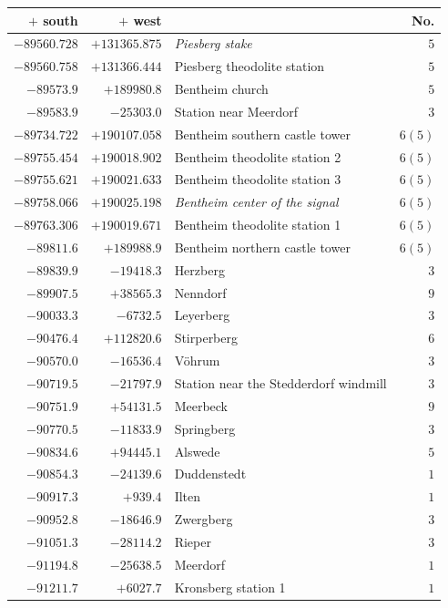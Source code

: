 \clearpage{}%
\begin{center}\begingroup\fontsize{8}{9}\selectfont
\setlength{\tabcolsep}{4pt}
\begin{tabular}{r|r|p{170pt}|r}\hline
\(+\) south&\(+\) west&&No.\\\hline
\(-89560.728\)&\(+131365.875\)&\textit{Piesberg stake}&\(5\)\\
\(-89560.758\)&\(+131366.444\)&Piesberg theodolite station&\(5\)\\
\(-89573.9\)&\(+189980.8\)&Bentheim church&\(5\)\\
\(-89583.9\)&\(-25303.0\)&Station near Meerdorf&\(3\)\\
\(-89734.722\)&\(+190107.058\)&Bentheim southern castle tower&\(6 (5)\)\\
\(-89755.454\)&\(+190018.902\)&Bentheim theodolite station 2&\(6 (5)\)\\
\(-89755.621\)&\(+190021.633\)&Bentheim theodolite station 3&\(6 (5)\)\\
\(-89758.066\)&\(+190025.198\)&\textit{Bentheim center of the signal}&\(6 (5)\)\\
\(-89763.306\)&\(+190019.671\)&Bentheim theodolite station 1&\(6 (5)\)\\
\(-89811.6\)&\(+189988.9\)&Bentheim northern castle tower&\(6 (5)\)\\
\(-89839.9\)&\(-19418.3\)&Herzberg&\(3\)\\
\(-89907.5\)&\(+38565.3\)&Nenndorf&\(9\)\\
\(-90033.3\)&\(-6732.5\)&Leyerberg&\(3\)\\
\(-90476.4\)&\(+112820.6\)&Stirperberg&\(6\)\\
\(-90570.0\)&\(-16536.4\)&Vöhrum&\(3\)\\
\(-90719.5\)&\(-21797.9\)&Station near the Stedderdorf windmill&\(3\)\\
\(-90751.9\)&\(+54131.5\)&Meerbeck&\(9\)\\
\(-90770.5\)&\(-11833.9\)&Springberg&\(3\)\\
\(-90834.6\)&\(+94445.1\)&Alswede&\(5\)\\
\(-90854.3\)&\(-24139.6\)&Duddenstedt&\(1\)\\
\(-90917.3\)&\(+939.4\)&Ilten&\(1\)\\
\(-90952.8\)&\(-18646.9\)&Zwergberg&\(3\)\\
\(-91051.3\)&\(-28114.2\)&Rieper&\(3\)\\
\(-91194.8\)&\(-25638.5\)&Meerdorf&\(1\)\\
\(-91211.7\)&\(+6027.7\)&Kronsberg station 1&\(1\)\\

\end{tabular}
\end{center}
